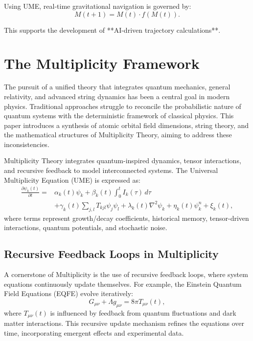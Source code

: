 \documentclass[12]{amsart}
\theoremstyle{plain}
\begin{document}
Using UME, real-time gravitational navigation is governed by:
\begin{equation}
M(t+1) = M(t) \cdot f(M(t)).
\end{equation}

This supports the development of **AI-driven trajectory calculations**.

\section{The Multiplicity Framework}
The pursuit of a unified theory that integrates quantum mechanics, general relativity, and advanced string dynamics has been a central goal in modern physics. Traditional approaches struggle to reconcile the probabilistic nature of quantum systems with the deterministic framework of classical physics. This paper introduces a synthesis of atomic orbital field dimensions, string theory, and the mathematical structures of Multiplicity Theory, aiming to address these inconsistencies.

Multiplicity Theory integrates quantum-inspired dynamics, tensor interactions, and recursive feedback to model interconnected systems. The Universal Multiplicity Equation (UME) is expressed as:
\begin{align}
\frac{\partial \psi_k(t)}{\partial t} = & \alpha_k(t)\psi_k + \beta_k(t) \int_0^t I_k(\tau)\,d\tau \\
& + \gamma_k(t)\sum_{j,l} T_{kjl}\psi_j\psi_l + \lambda_k(t)\nabla^2\psi_k + \eta_k(t)\psi_k^n + \xi_k(t),
\end{align}
where terms represent growth/decay coefficients, historical memory, tensor-driven interactions, quantum potentials, and stochastic noise.
\subsection{Recursive Feedback Loops in Multiplicity}
A cornerstone of Multiplicity is the use of recursive feedback loops, where system equations continuously update themselves. For example, the Einstein Quantum Field Equations (EQFE) evolve iteratively:
\begin{equation}
G_{\mu\nu} + \Lambda g_{\mu\nu} = 8\pi T_{\mu\nu}(t),
\end{equation}
where \(T_{\mu\nu}(t)\) is influenced by feedback from quantum fluctuations and dark matter interactions. This recursive update mechanism refines the equations over time, incorporating emergent effects and experimental data.
\end{document}

